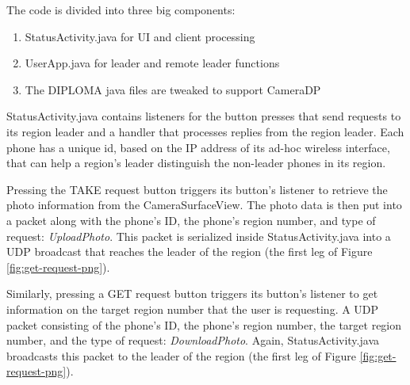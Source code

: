 The code is divided into three big components: 
\begin{enumerate}
\item
StatusActivity.java for UI and client processing
\item
UserApp.java for leader and remote leader functions
\item
The DIPLOMA java files are tweaked to support CameraDP
\end{enumerate}
StatusActivity.java contains listeners for the button presses that send requests to its region leader and a handler that processes replies from the region leader. Each phone has a unique id, based on the IP address of its ad-hoc wireless interface, that can help a region's leader distinguish the non-leader phones in its region.  

Pressing the TAKE request button triggers its button's listener to retrieve the photo information from the CameraSurfaceView. The photo data is then put into a packet along with the phone's ID, the phone's region number, and type of request: {\it UploadPhoto}. This packet is serialized inside StatusActivity.java into a UDP broadcast that reaches the leader of the region (the first leg of Figure \ref{fig:get-request-png}).

Similarly, pressing a GET request button triggers its button's listener to get information on the target region number that the user is requesting. A UDP packet consisting of the phone's ID, the phone's region number, the target region number, and the type of request: {\it DownloadPhoto}. Again, StatusActivity.java broadcasts this packet to the leader of the region (the first leg of Figure \ref{fig:get-request-png}).

